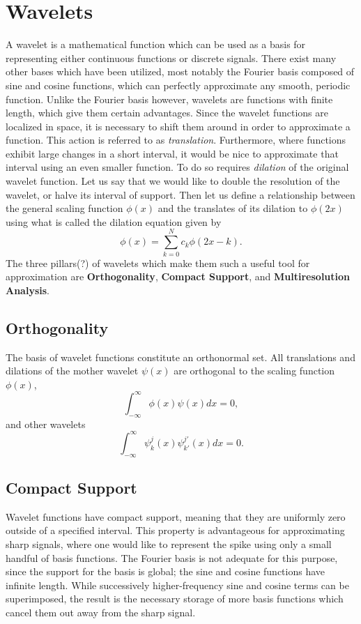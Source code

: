 \documentclass[11pt]{article}
\begin{document}
\section{Wavelets}
A wavelet is a mathematical function which can be used as a basis for representing either continuous functions or 
discrete signals. There exist many other bases which have been utilized, most notably the Fourier
basis composed of sine and cosine functions, which can perfectly approximate any smooth, periodic function. 
Unlike the Fourier basis however, wavelets are functions with finite length, which give them certain advantages.
Since the wavelet functions are localized in space, it is necessary to shift them around in order to approximate
a function. This action is referred to as \textit{translation}. Furthermore, where functions exhibit large changes in a short interval,
it would be nice to approximate that interval using an even smaller function. To do so requires \textit{dilation} of the original
wavelet function. Let us say that we would like to double the resolution of the wavelet, or halve its interval of support.
Then let us define a relationship between the general scaling function $\phi(x)$ and the translates of its dilation
to $\phi(2x)$ using what is called the dilation equation given by
\begin{equation}
\phi(x) = \sum_{k=0}^{N} c_k \phi(2x-k).
\label{dilation equation}
\end{equation}
The three pillars(?) of wavelets which make them such a useful tool for approximation are \textbf{Orthogonality}, \textbf{Compact Support}, and \textbf{Multiresolution Analysis}.
\subsection{Orthogonality}
The basis of wavelet functions constitute an orthonormal set. All translations and dilations of the mother wavelet $\psi(x)$
are orthogonal to the scaling function $\phi(x)$, 
\begin{equation}
\int_{-\infty}^{\infty} \phi(x) \psi(x) dx = 0,
\end{equation}
and other wavelets
\begin{equation}
\int_{-\infty}^{\infty} \psi_{k}^{j}(x) \psi_{k'}^{j'}(x) dx = 0.
\end{equation}
\subsection{Compact Support}
Wavelet functions have compact support, meaning that they are uniformly zero outside of a specified interval.
This property is advantageous for approximating sharp signals, where one would like to represent the spike using only a small 
handful of basis functions. The Fourier basis is not adequate for this purpose, since the support for the basis is global; 
the sine and cosine functions have infinite length. While successively higher-frequency sine and cosine terms 
can be superimposed, the result is the necessary storage of more basis functions which cancel them out away
from the sharp signal. 
\end{document}
